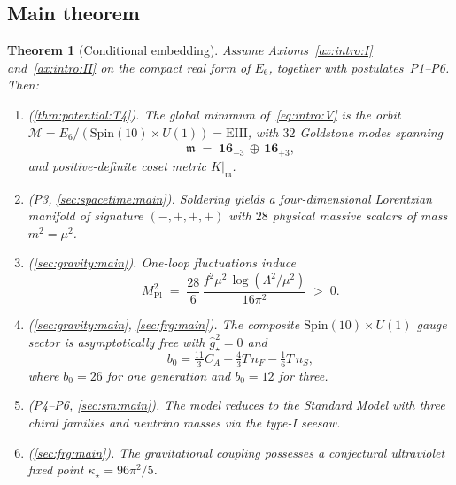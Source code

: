 \documentclass[11pt]{article}
\theoremstyle{plain}
\newtheorem{theorem}{Theorem}[section]
\theoremstyle{definition}
\theoremstyle{remark}
\begin{document}
\subsection{Main theorem}
\label{sec:intro:claim}

\begin{theorem}[Conditional embedding]\label{thm:intro:embedding}
Assume Axioms~\autoref{ax:intro:I} and~\autoref{ax:intro:II} on the compact real
form of $E_6$, together with postulates~\textnormal{P1--P6}. Then:
\begin{enumerate}[label=\textup{(\roman*)}]
  \item \textnormal{(\autoref{thm:potential:T4}).}
    The global minimum of~\eqref{eq:intro:V} is the orbit
    $\mathcal{M}=E_6/(\mathrm{Spin}(10)\times U(1))=\mathrm{EIII}$,
    with $32$ Goldstone modes spanning
    \begin{equation}
      \mathfrak{m}\;=\;\mathbf{16}_{-3}\,\oplus\,\overline{\mathbf{16}}_{+3},
      \label{eq:intro:coset}
    \end{equation}
    and positive-definite coset metric $K|_{\mathfrak{m}}$.
  \item \textnormal{(P3, \autoref{sec:spacetime:main}).}
    Soldering yields a four-dimensional Lorentzian manifold of signature
    $(-,+,+,+)$ with $28$ physical massive scalars of mass $m^{2}=\mu^{2}$.
  \item \textnormal{(\autoref{sec:gravity:main}).}
    One-loop fluctuations induce
    \begin{equation}
      M_{\mathrm{Pl}}^{2}\;=\;\frac{28}{6}\,
      \frac{f^{2}\mu^{2}\,\log(\Lambda^{2}/\mu^{2})}{16\pi^{2}}\;>\;0.
      \label{eq:intro:MPl}
    \end{equation}
  \item \textnormal{(\autoref{sec:gravity:main}, \autoref{sec:frg:main}).}
    The composite $\mathrm{Spin}(10)\times U(1)$ gauge sector is asymptotically
    free with $\hat g^{2}_\star=0$ and
    \begin{equation}
      b_0=\tfrac{11}{3}C_A-\tfrac{4}{3}T\,n_F-\tfrac{1}{6}T\,n_S,
      \label{eq:intro:betag}
    \end{equation}
    where $b_0=26$ for one generation and $b_0=12$ for three.
  \item \textnormal{(P4--P6, \autoref{sec:sm:main}).}
    The model reduces to the Standard Model with three chiral families and
    neutrino masses via the type-I seesaw.
  \item \textnormal{(\autoref{sec:frg:main}).}
    The gravitational coupling possesses a conjectural ultraviolet fixed point
    $\kappa_\star=96\pi^{2}/5$.
\end{enumerate}
\end{theorem}
\end{document}
